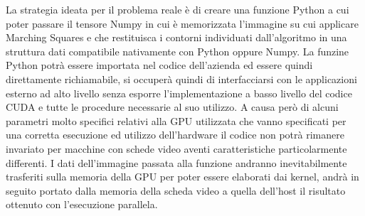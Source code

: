 \documentclass[12pt,a4paper]{report}
\begin{document}
La strategia ideata per il problema reale è di creare una funzione Python a cui poter passare il tensore Numpy in cui è memorizzata l'immagine su cui applicare Marching Squares e che restituisca i contorni individuati dall'algoritmo in una struttura dati compatibile nativamente con Python oppure Numpy. \newline
La funzine Python potrà essere importata nel codice dell'azienda ed essere quindi direttamente richiamabile, si occuperà quindi di interfacciarsi con le applicazioni esterno ad alto livello senza esporre l'implementazione a basso livello del codice CUDA e tutte le procedure necessarie al suo utilizzo. 
A causa però di alcuni parametri molto specifici relativi alla GPU utilizzata che vanno specificati per una corretta esecuzione ed utilizzo dell'hardware il codice non potrà rimanere invariato per macchine con schede video aventi caratteristiche particolarmente differenti.
I dati dell'immagine passata alla funzione andranno inevitabilmente trasferiti sulla memoria della GPU per poter essere elaborati dai kernel, andrà in seguito portato dalla memoria della scheda video a quella dell'host il risultato ottenuto con l'esecuzione parallela. %
\end{document}
